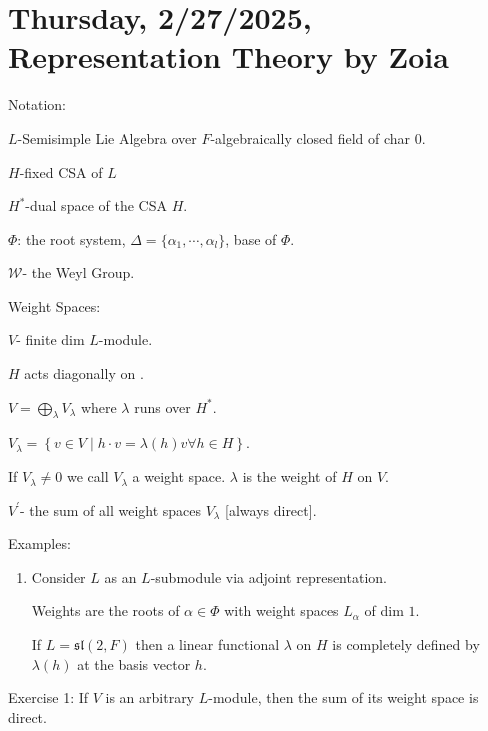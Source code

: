 \documentclass{article}
\theoremstyle{definition}
\begin{document}
    \section{Thursday, 2/27/2025, Representation Theory by Zoia}
    
    Notation:

    \(L\)-Semisimple Lie Algebra over \(F\)-algebraically closed field of char \(0\).

    \(H\)-fixed CSA of \(L\)
    
    \(H^{\ast}\)-dual space of the CSA \(H\).

    \(\Phi\): the root system, \(\Delta = \{ \alpha_1, \cdots , \alpha_l \}\), base of \(\Phi\).
    
    \(\mathcal{W}\)- the Weyl Group.

    Weight Spaces:

    \(V\)- finite dim \(L\)-module.

    \(H\) acts diagonally on \(\).

    \(V = \bigoplus_\lambda V_\lambda\) where \(\lambda\) runs over \(H^{\ast}\).

    \(V_\lambda = \left\{ v\in V \mid h \cdot v = \lambda(h)v \forall h \in H \right\}\).

    If \(V_\lambda \neq 0\) we call \(V_\lambda\) a weight space. \(\lambda\) is the weight of \(H\) on \(V\).

    \(V^{\prime}\)- the sum of all weight spaces \(V_\lambda\) [always direct].

    Examples:

    \begin{enumerate}[label=\arabic*)]
        \item Consider \(L\) as an \(L\)-submodule via adjoint representation.
        
        Weights are the roots of \(\alpha \in \Phi \) with weight spaces \(L_\alpha\) of dim \(1\).

        If \(L = \mathfrak{sl}(2,F)\) then a linear functional \(\lambda\) on \(H\) is completely defined by \(\lambda(h)\) at the basis vector \(h\).


    \end{enumerate} 

    Exercise 1: If \(V\) is an arbitrary \(L\)-module, then the sum of its weight space is direct.
\end{document}
